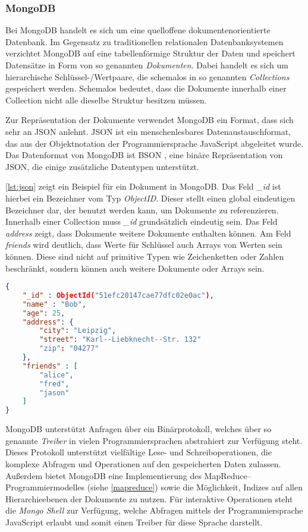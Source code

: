 \subsubsection{MongoDB}
\label{mongo}

Bei MongoDB handelt es sich um eine quelloffene dokumentenorientierte Datenbank. Im Gegensatz zu traditionellen relationalen Datenbanksystemen verzichtet MongoDB auf eine tabellenförmige Struktur der Daten und speichert Datensätze in Form von so genannten \emph{Dokumenten}. Dabei handelt es sich um hierarchische Schlüssel-/Wertpaare, die schemalos in so genannten \emph{Collections} gespeichert werden. Schemalos bedeutet, dass die Dokumente innerhalb einer Collection nicht alle dieselbe Struktur besitzen müssen.

Zur Repräsentation der Dokumente verwendet MongoDB ein Format, dass sich sehr an JSON \cite{json2006} anlehnt. JSON ist ein menschenlesbares Datenaustauschformat, das aus der Objektnotation der Programmiersprache JavaScript abgeleitet wurde. Das Datenformat von MongoDB ist BSON \cite{bson2013}, eine binäre Repräsentation von JSON, die einige zusätzliche Datentypen unterstützt. 

\cref{lst:json} zeigt ein Beispiel für ein Dokument in MongoDB. Das Feld \emph{\_id} ist hierbei ein  Bezeichner vom Typ \emph{ObjectID}. Dieser stellt einen global eindeutigen Bezeichner dar, der benutzt werden kann, um Dokumente zu referenzieren. Innerhalb einer Collection muss \emph{\_id} grundsätzlich eindeutig sein. Das Feld \emph{address} zeigt, dass Dokumente weitere Dokumente enthalten können. Am Feld \emph{friends} wird deutlich, dass Werte für Schlüssel auch Arrays von Werten sein können. Diese sind nicht auf primitive Typen wie Zeichenketten oder Zahlen beschränkt, sondern können auch weitere Dokumente oder Arrays sein.

\begin{lstlisting}[language=json, label={lst:json}, caption={JSON--Beispiel für ein Dokument in MongoDB}, float]
{
    "_id" : ObjectId("51efc20147cae77dfc02e0ac"),
    "name" : "Bob",
    "age": 25,
    "address": {
        "city": "Leipzig",
        "street": "Karl--Liebknecht--Str. 132"
        "zip": "04277"
    },
    "friends" : [
        "alice",
        "fred",
        "jason"
    ]
}
\end{lstlisting}

MongoDB unterstützt Anfragen über ein Binärprotokoll, welches über so genannte \emph{Treiber} in vielen Programmiersprachen abstrahiert zur Verfügung steht. Dieses Protokoll unterstützt vielfältige Lese- und Schreiboperationen, die komplexe Abfragen und Operationen auf den gespeicherten Daten zulassen. Außerdem bietet MongoDB eine Implementierung des MapReduce--Programmiermodelles (siehe \cref{mapreduce}) sowie die Möglichkeit, Indizes auf allen Hierarchieebenen der Dokumente zu nutzen. Für interaktive Operationen steht die \emph{Mongo Shell} zur Verfügung, welche Abfragen mittels der Programmiersprache JavaScript erlaubt und somit einen Treiber für diese Sprache darstellt.

